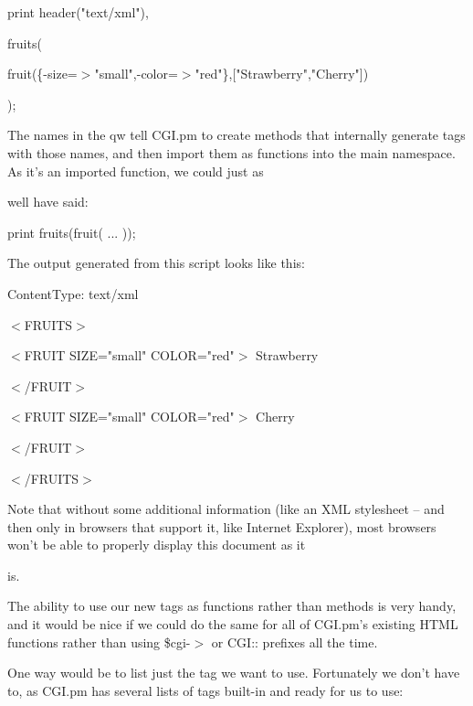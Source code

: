 \documentclass[a4paper,11pt]{book}
\begin{document}
\noindent 

\noindent print header("text/xml"),

\noindent fruits(

\noindent fruit(\{-size=$>$"small",-color=$>$"red"\},["Strawberry","Cherry"])

\noindent );

\noindent 

\noindent The names in the qw tell CGI.pm to create methods that internally generate tags with those names, and then import them as functions into the main namespace. As it's an imported function, we could just as

\noindent well have said:

\noindent 

\noindent print fruits(fruit( ... ));

\noindent 

\noindent The output generated from this script looks like this:

\noindent 

\noindent ContentType: text/xml

\noindent 

\noindent $<$FRUITS$>$

\noindent 

\noindent $<$FRUIT SIZE="small" COLOR="red"$>$ Strawberry

\noindent $<$/FRUIT$>$

\noindent $<$FRUIT SIZE="small" COLOR="red"$>$ Cherry

\noindent $<$/FRUIT$>$

\noindent $<$/FRUITS$>$

\noindent 

\noindent Note that without some additional information (like an XML stylesheet -- and then only in browsers that support it, like Internet Explorer), most browsers won't be able to properly display this document as it

\noindent is.

\noindent 

\noindent The ability to use our new tags as functions rather than methods is very handy, and it would be nice if we could do the same for all of CGI.pm's existing HTML functions rather than using \$cgi-$>$ or CGI:: prefixes all the time.

\noindent 

\noindent One way would be to list just the tag we want to use. Fortunately we don't have to, as CGI.pm has several lists of tags built-in and ready for us to use:
\end{document}
